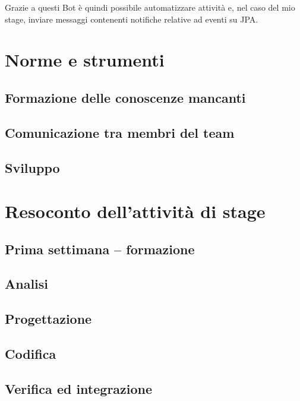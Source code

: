 Grazie a questi Bot è quindi possibile automatizzare attività e, nel caso del
mio stage, inviare messaggi contenenti notifiche relative ad eventi su JPA.

\section{Norme e strumenti}

\subsection{Formazione delle conoscenze mancanti}

\subsection{Comunicazione tra membri del team}

\subsection{Sviluppo}

\section{Resoconto dell'attività di stage}

\subsection{Prima settimana -- formazione}

\subsection{Analisi}

\subsection{Progettazione}

\subsection{Codifica}

\subsection{Verifica ed integrazione}
